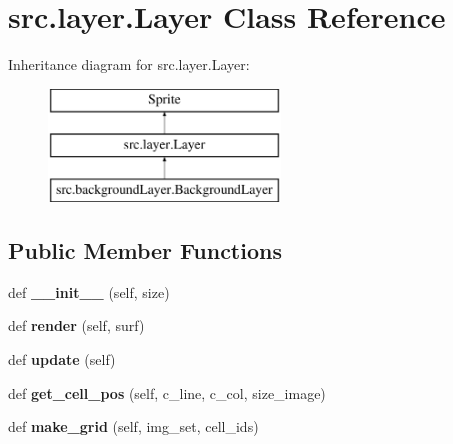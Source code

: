 \hypertarget{classsrc_1_1layer_1_1_layer}{}\section{src.\+layer.\+Layer Class Reference}
\label{classsrc_1_1layer_1_1_layer}
Inheritance diagram for src.\+layer.\+Layer\+:\begin{figure}[H]
\begin{center}
\leavevmode
\includegraphics[height=3.000000cm]{classsrc_1_1layer_1_1_layer}
\end{center}
\end{figure}
\subsection*{Public Member Functions}
\begin{DoxyCompactItemize}
\item 
\hypertarget{classsrc_1_1layer_1_1_layer_afb0f95173b44d2cd9942a3bec2b84eeb}{}\label{classsrc_1_1layer_1_1_layer_afb0f95173b44d2cd9942a3bec2b84eeb} 
def {\bfseries \+\_\+\+\_\+init\+\_\+\+\_\+} (self, size)
\item 
\hypertarget{classsrc_1_1layer_1_1_layer_a78a4e2da87ec9a61fe566359ace3d67b}{}\label{classsrc_1_1layer_1_1_layer_a78a4e2da87ec9a61fe566359ace3d67b} 
def {\bfseries render} (self, surf)
\item 
\hypertarget{classsrc_1_1layer_1_1_layer_a6f780023058a52954127d05226d167f7}{}\label{classsrc_1_1layer_1_1_layer_a6f780023058a52954127d05226d167f7} 
def {\bfseries update} (self)
\item 
\hypertarget{classsrc_1_1layer_1_1_layer_acb009d1cb2cbb276f3e1d880dc766190}{}\label{classsrc_1_1layer_1_1_layer_acb009d1cb2cbb276f3e1d880dc766190} 
def {\bfseries get\+\_\+cell\+\_\+pos} (self, c\+\_\+line, c\+\_\+col, size\+\_\+image)
\item 
\hypertarget{classsrc_1_1layer_1_1_layer_a6d99c2cef696b679bbc26f4307b21427}{}\label{classsrc_1_1layer_1_1_layer_a6d99c2cef696b679bbc26f4307b21427} 
def {\bfseries make\+\_\+grid} (self, img\+\_\+set, cell\+\_\+ids)
\end{DoxyCompactItemize}
